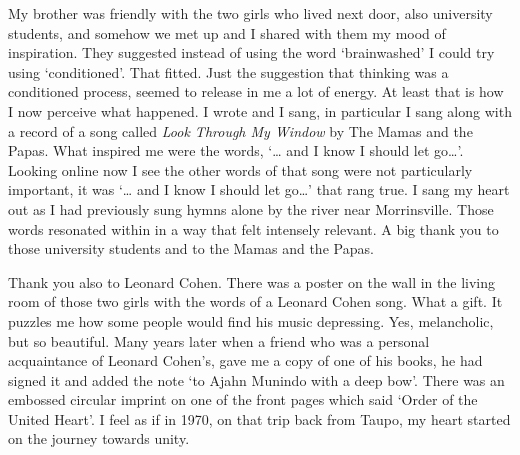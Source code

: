 My brother was friendly with the two girls who lived next door, also
university students, and somehow we met up and I shared with them my
mood of inspiration. They suggested instead of using the word
`brainwashed' I could try using `conditioned'. That fitted. Just the
suggestion that thinking was a conditioned process, seemed to release in
me a lot of energy. At least that is how I now perceive what happened. I
wrote and I sang, in particular I sang along with a record of a song
called \emph{Look Through My Window} by The Mamas and the Papas. What
inspired me were the words, `\ldots{} and I know I should let go\ldots{}'.
Looking online\cite{window} now I see the other words of that song were not
particularly important, it was `\ldots{} and I know I should let
go\ldots{}' that rang true. I sang my heart out as I had
previously sung hymns alone by the river near Morrinsville. Those words
resonated within in a way that felt intensely relevant. A big thank you
to those university students and to the Mamas and the Papas.

Thank you also to Leonard Cohen. There was a poster on the wall in the
living room of those two girls with the words of a Leonard Cohen song.
What a gift. It puzzles me how some people would find his music
depressing. Yes, melancholic, but so beautiful. Many years later when a
friend who was a personal acquaintance of Leonard Cohen's, gave me a
copy of one of his books, he had signed it and added the note `to Ajahn
Munindo with a deep bow'. There was an embossed circular imprint
on one of the front pages which said `Order of the United Heart'. I feel
as if in 1970, on that trip back from Taupo, my heart started on the
journey towards unity.

